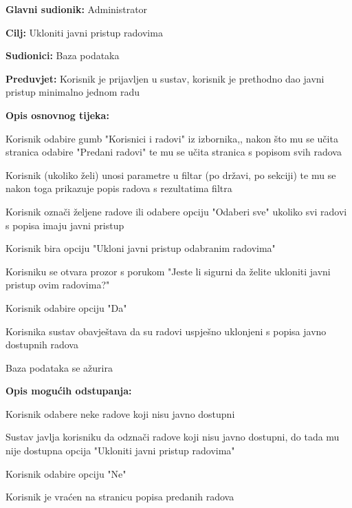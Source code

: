					\noindent {}
					\begin{packed_item}
						\item \textbf{Glavni sudionik:} Administrator
						\item \textbf{Cilj:} Ukloniti javni pristup radovima
						\item \textbf{Sudionici:} Baza podataka
						\item \textbf{Preduvjet:} Korisnik je prijavljen u sustav, korisnik je prethodno dao javni pristup minimalno jednom radu
						
						\item \textbf{Opis osnovnog tijeka:} 
						\item[] \begin{packed_enum}
							\item Korisnik odabire gumb "Korisnici i radovi" iz izbornika,, nakon što mu se učita stranica odabire "Predani radovi" te mu se učita stranica s popisom svih radova
							\item Korisnik (ukoliko želi) unosi parametre u filtar (po državi, po sekciji) te mu se nakon toga prikazuje popis radova s rezultatima filtra
							\item Korisnik označi željene radove ili odabere opciju "Odaberi sve" ukoliko svi radovi s popisa imaju javni pristup
							\item Korisnik bira opciju "Ukloni javni pristup odabranim radovima"
							\item Korisniku se otvara prozor s porukom "Jeste li sigurni da želite ukloniti javni pristup ovim radovima?"
							\item Korisnik odabire opciju "Da"
							\item Korisnika sustav obavještava da su radovi uspješno uklonjeni s popisa javno dostupnih radova
							\item Baza podataka se ažurira
						\end{packed_enum}
					
						\item \textbf{Opis mogućih odstupanja:}
						\item[] \begin{packed_enum}
							\item[1.a] Korisnik odabere neke radove koji nisu javno dostupni
							\item[] \begin{packed_enum}
								\item[1.] Sustav javlja korisniku da odznači radove koji nisu javno dostupni, do tada mu nije dostupna opcija "Ukloniti javni pristup radovima"

							\end{packed_enum}
							\item[6.a] Korisnik odabire opciju "Ne"
							\item[] \begin{packed_enum}
								\item[1.] Korisnik je vraćen na stranicu popisa predanih radova
							\end{packed_enum} 
						\end{packed_enum}
					\end{packed_item}

